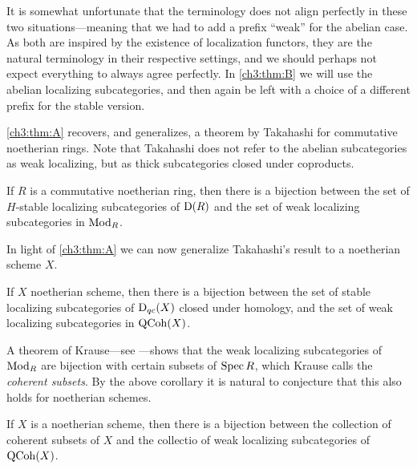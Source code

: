 \begin{remark}
    It is somewhat unfortunate that the terminology does not align perfectly in these two situations---meaning that we had to add a prefix ``weak'' for the abelian case. As both are inspired by the existence of localization functors, they are the natural terminology in their respective settings, and we should perhaps not expect everything to always agree perfectly. In \cref{ch3:thm:B} we will use the abelian localizing subcategories, and then again be left with a choice of a different prefix for the stable version. 
\end{remark}

\cref{ch3:thm:A} recovers, and generalizes, a theorem by Takahashi for commutative noetherian rings. Note that Takahashi does not refer to the abelian subcategories as weak localizing, but as thick subcategories closed under coproducts. 

\begin{corollary}
    \label{ch3:cor:takahashi-weak-localizing}
    If $R$ is a commutative noetherian ring, then there is a bijection between the set of $H$-stable localizing subcategories of $\mathrm{D}(R)$ and the set of weak localizing subcategories in $\mathrm{Mod}_R$. 
\end{corollary}

In light of \cref{ch3:thm:A} we can now generalize Takahashi's result to a noetherian scheme $X$. 

\begin{corollary}
    \label{ch3:cor:noetherian-scheme-weak-localizing}
    If $X$ noetherian scheme, then there is a bijection between the set of stable localizing subcategories of $\mathrm{D}_{qc}(X)$ closed under homology, and the set of weak localizing subcategories in $\operatorname{QCoh}(X)$. 
\end{corollary}

A theorem of Krause---see \cite[3.1]{krause_2008}---shows that the weak localizing subcategories of $\mathrm{Mod}_R$ are bijection with certain subsets of $\operatorname{Spec} R$, which Krause calls the \emph{coherent subsets}. By the above corollary it is natural to conjecture that this also holds for noetherian schemes. 

\begin{conjecture}
    \label{ch3:conj:coherent-noetherian-scheme}
    If $X$ is a noetherian scheme, then there is a bijection between the collection of coherent subsets of $X$ and the collectio of weak localizing subcategories of $\operatorname{QCoh}(X)$. 
\end{conjecture}

